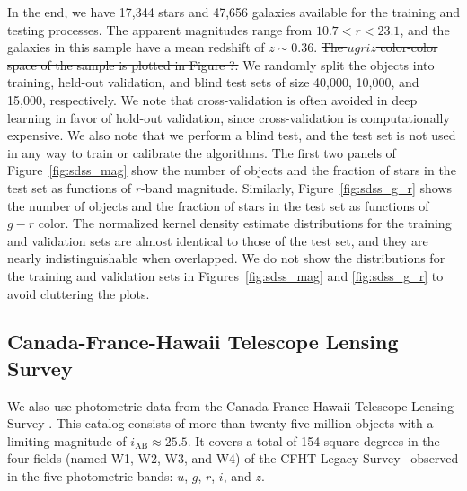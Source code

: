 \documentclass[fleqn,usenatbib]{mnras}
\begin{document}
In the end, we have 17,344 stars and 47,656 galaxies available
for the training and testing processes.
The apparent magnitudes range from $10.7 < r < 23.1$,
and the galaxies in this sample have a mean redshift of $z \sim 0.36$.
\sout{ The $ugriz$ color-color space of the sample is plotted in Figure ?.}
We randomly split the objects into training, held-out validation,
and blind test sets of size 40,000, 10,000, and 15,000, respectively.
We note that cross-validation is often avoided in deep learning
in favor of hold-out validation,
since cross-validation is computationally expensive.
We also note that we perform a blind test, and the test set is not used in any
way to train or calibrate the algorithms.
The first two panels of Figure~\ref{fig:sdss_mag} show the number of objects
and the fraction of stars in the test set as functions of $r$-band magnitude.
Similarly, Figure~\ref{fig:sdss_g_r} shows the number of objects and the
fraction of stars in the test set as functions of $g-r$ color.
The normalized kernel density estimate distributions for the training
and validation sets are almost identical to those of the test set,
and they are nearly indistinguishable when overlapped.
We do not show the distributions for the training and validation sets in
Figures~\ref{fig:sdss_mag} and \ref{fig:sdss_g_r} to avoid cluttering the
plots.


\subsection{Canada-France-Hawaii Telescope Lensing Survey}


We also use photometric data from
the Canada-France-Hawaii Telescope Lensing Survey
\cite[CFHTLenS\footnote{http://www.cfhtlens.org/};][]
{heymans2012cfhtlens,erben2013cfhtlens,hildebrandt2012cfhtlens}.
This catalog consists of more than twenty five million objects
with a limiting magnitude of $i_{\text{AB}} \approx 25.5$. 
It covers a total of 154 square degrees
in the four fields (named W1, W2, W3, and W4)
of the CFHT Legacy Survey~\citep[CFHTLS;][]{gwyn2012canada}
observed in the five photometric bands:
$u$, $g$, $r$, $i$, and $z$.
\end{document}
